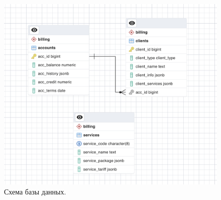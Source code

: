 \documentclass[oneside,senior,etd]{BYUPhysForDegree}
\begin{document}
\begin{figure}[hbt!]
    \centering
    \includegraphics[width=1.0\linewidth]{scheme.png}
    \caption{Схема базы данных.}
    \label{fig:scheme}
\end{figure}
\end{document}
